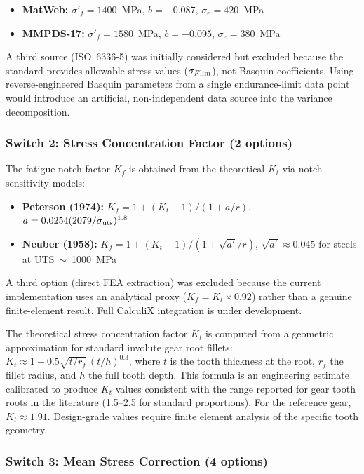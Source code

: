 \documentclass[12pt,a4paper]{article}
\begin{document}
\begin{itemize}
  \item \textbf{MatWeb:} $\sigma'_f = 1400$~MPa, $b=-0.087$,
        $\sigma_e=420$~MPa
  \item \textbf{MMPDS-17:} $\sigma'_f = 1580$~MPa, $b=-0.095$,
        $\sigma_e=380$~MPa
\end{itemize}

A third source (ISO~6336-5) was initially considered but excluded because
the standard provides allowable stress values ($\sigma_{F\rm lim}$), not
Basquin coefficients. Using reverse-engineered Basquin parameters from a
single endurance-limit data point would introduce an artificial,
non-independent data source into the variance decomposition.

\subsubsection{Switch 2: Stress Concentration Factor (2 options)}

The fatigue notch factor $K_f$ is obtained from the theoretical
$K_t$ via notch sensitivity models:

\begin{itemize}
  \item \textbf{Peterson (1974):}
        $K_f = 1 + (K_t-1)/(1+a/r)$, $a=0.0254(2079/\sigma_{\rm uts})^{1.8}$
  \item \textbf{Neuber (1958):}
        $K_f = 1 + (K_t-1)/(1+\sqrt{a'}/r)$, $\sqrt{a'}\approx0.045$
        for steels at UTS~$\sim$~1000~MPa
\end{itemize}

A third option (direct FEA extraction) was excluded because the current
implementation uses an analytical proxy ($K_f = K_t \times 0.92$) rather
than a genuine finite-element result. Full CalculiX integration is under
development.

The theoretical stress concentration factor $K_t$ is computed from a
geometric approximation for standard involute gear root fillets:
$K_t \approx 1 + 0.5\sqrt{t/r_f}\,(t/h)^{0.3}$, where $t$ is the tooth
thickness at the root, $r_f$ the fillet radius, and $h$ the full tooth
depth. This formula is an engineering estimate calibrated to produce
$K_t$ values consistent with the range reported for gear tooth roots in
the literature (1.5--2.5 for standard proportions). For the reference
gear, $K_t \approx 1.91$. Design-grade values require finite element
analysis of the specific tooth geometry.

\subsubsection{Switch 3: Mean Stress Correction (4 options)}
\end{document}
